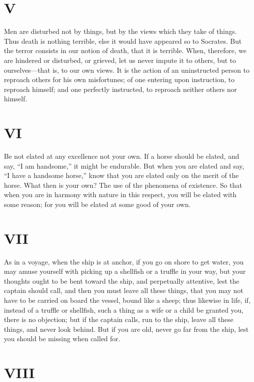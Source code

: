 \documentclass[11pt]{article}
\begin{document}
\section*{V}

Men are disturbed not by things, but by the views which they take of things. Thus death is nothing terrible, else it would have appeared so to Socrates. But the terror consists in our notion of death, that it is terrible. When, therefore, we are hindered or disturbed, or grieved, let us never impute it to others, but to ourselves—that is, to our own views. It is the action of an uninstructed person to reproach others for his own misfortunes; of one entering upon instruction, to reproach himself; and one perfectly instructed, to reproach neither others nor himself.

\section*{VI}

Be not elated at any excellence not your own. If a horse should be elated, and say, “I am handsome,” it might be endurable. But when you are elated and say, “I have a handsome horse,” know that you are elated only on the merit of the horse. What then is your own? The use of the phenomena of existence. So that when you are in harmony with nature in this respect, you will be elated with some reason; for you will be elated at some good of your own.

\section*{VII}

As in a voyage, when the ship is at anchor, if you go on shore to get water, you may amuse yourself with picking up a shellfish or a truffle in your way, but your thoughts ought to be bent toward the ship, and perpetually attentive, lest the captain should call, and then you must leave all these things, that you may not have to be carried on board the vessel, bound like a sheep; thus likewise in life, if, instead of a truffle or shellfish, such a thing as a wife or a child be granted you, there is no objection; but if the captain calls, run to the ship, leave all these things, and never look behind. But if you are old, never go far from the ship, lest you should be missing when called for.
\section*{VIII}
\end{document}
